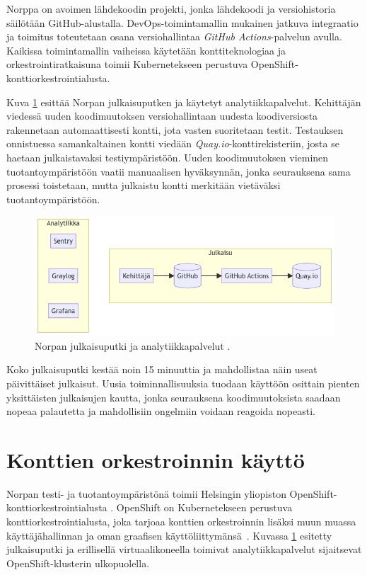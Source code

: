 Norppa on avoimen lähdekoodin projekti, jonka lähdekoodi ja versiohistoria säilötään GitHub-alustalla.
DevOps-toimintamallin mukainen jatkuva integraatio ja toimitus toteutetaan osana versiohallintaa \textit{GitHub Actions}-palvelun avulla.
Kaikissa toimintamallin vaiheissa käytetään konttiteknologiaa ja orkestrointiratkaisuna toimii Kubernetekseen perustuva OpenShift-konttiorkestrointialusta.

Kuva \ref{fig:norppa:deployment} esittää Norpan julkaisuputken ja käytetyt analytiikkapalvelut.
Kehittäjän viedessä uuden koodimuutoksen versiohallintaan uudesta koodiversiosta rakennetaan automaattisesti kontti, jota vasten suoritetaan testit.
Testauksen onnistuessa samankaltainen kontti viedään \textit{Quay.io}-konttirekisteriin, josta se haetaan julkaistavaksi testiympäristöön.
Uuden koodimuutoksen vieminen tuotantoympäristöön vaatii manuaalisen hyväksynnän, jonka seurauksena sama prosessi toistetaan, mutta julkaistu kontti merkitään vietäväksi tuotantoympäristöön.

\begin{figure}[ht]
\begin{center}
\includegraphics[width=1\textwidth]{figures/norppa_deployment.png}
\caption{Norpan julkaisuputki ja analytiikkapalvelut \cite{Norppa23}\label{fig:norppa:deployment}.}
\end{center}
\end{figure}

Koko julkaisuputki kestää noin 15 minuuttia ja mahdollistaa näin useat päivittäiset julkaisut.
Uusia toiminnallisuuksia tuodaan käyttöön osittain pienten yksittäisten julkaisujen kautta, jonka seurauksena koodimuutoksista saadaan nopeaa palautetta ja mahdollisiin ongelmiin voidaan reagoida nopeasti.

\section{Konttien orkestroinnin käyttö}

Norpan testi- ja tuotantoympäristönä toimii Helsingin yliopiston OpenShift-konttiorkes\-trointialusta \cite{Helsinki21}.
OpenShift on Kubernetekseen perustuva konttiorkestrointialusta, joka tarjoaa konttien orkestroinnin lisäksi muun muassa käyttäjähallinnan ja oman graafisen käyttöliittymänsä~\cite{Lossent17}.
Kuvassa \ref{fig:norppa:deployment} esitetty julkaisuputki ja erillisellä virtuaalikoneella toimivat analytiikkapalvelut sijaitsevat OpenShift-klusterin ulkopuolella.

